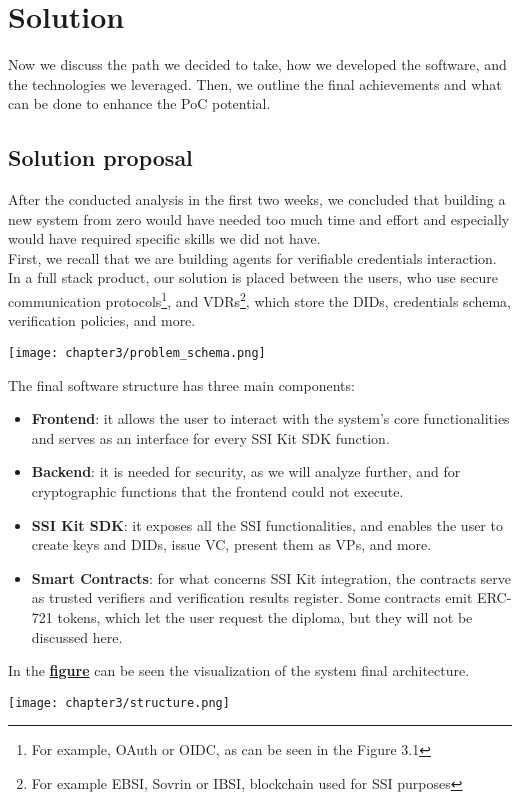 
\chapter{Solution}
Now we discuss the path we decided to take, how we developed the software, 
and the technologies we leveraged. Then, we outline the final achievements 
and what can be done to enhance the PoC potential.
\section{Solution proposal}
After the conducted analysis in the first two weeks, we concluded that building a 
new system from zero would have needed too much time and effort and especially would 
have required specific skills we did not have.\\
First, we recall that we are building agents for verifiable credentials interaction. 
In a full stack product, our solution is placed between the users, who use secure 
communication protocols\footnote{For example, OAuth or OIDC, as can be seen in the
Figure 3.1},  and VDRs\footnote{For example EBSI, Sovrin or IBSI, blockchain used for
SSI purposes}, which store the DIDs, credentials schema, verification policies, 
and more.
\begin{center}
    \texttt{[image: chapter3/problem\_schema.png]}
\end{center}
\vspace*{0.5cm}
The final software structure has three main components:
\begin{itemize}
    \item \textbf{Frontend}: it allows the user to interact with the system's core 
    functionalities and serves as an interface for every SSI Kit SDK function.
    \item \textbf{Backend}: it is needed for security, as we will analyze 
    further, and for cryptographic functions that the frontend could not execute.
    \item \textbf{SSI Kit SDK}: it exposes all the SSI functionalities, and enables 
    the user to create keys and DIDs, issue VC, present them as VPs, and more.
    \item \textbf{Smart Contracts}: for what concerns SSI Kit integration, the 
    contracts serve as trusted verifiers and verification results register. Some 
    contracts emit ERC-721 tokens, which let the user request the diploma, but they 
    will not be discussed here.
\end{itemize}
In the \href{fig:structure}{\textbf{figure}} can be seen the visualization of the 
system final architecture.
\begin{center}
    \texttt{[image: chapter3/structure.png]}
    \label{fig:structure}
\end{center}

